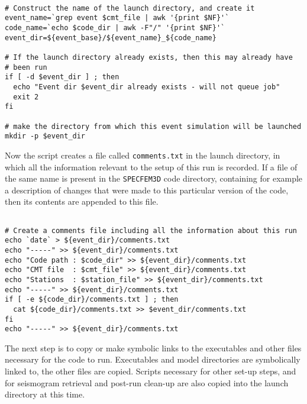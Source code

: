 \documentclass[onecolumn]{article}
\begin{document}
{\small
\begin{verbatim}

# Construct the name of the launch directory, and create it
event_name=`grep event $cmt_file | awk '{print $NF}'`
code_name=`echo $code_dir | awk -F"/" '{print $NF}'`
event_dir=${event_base}/${event_name}_${code_name}

# If the launch directory already exists, then this may already have
# been run
if [ -d $event_dir ] ; then
  echo "Event dir $event_dir already exists - will not queue job"
  exit 2
fi

# make the directory from which this event simulation will be launched
mkdir -p $event_dir

\end{verbatim}}

Now the script creates a file called \texttt{comments.txt} in the launch
directory, in which all the information relevant to the setup of this run
is recorded.
If a file of the same name is present in the \texttt{SPECFEM3D} code
directory, containing for example a description of changes that were
made to this particular version of the code, then its contents are appended
to this file.

{\small
\begin{verbatim}

# Create a comments file including all the information about this run
echo `date` > ${event_dir}/comments.txt
echo "-----" >> ${event_dir}/comments.txt
echo "Code path : $code_dir" >> ${event_dir}/comments.txt
echo "CMT file  : $cmt_file" >> ${event_dir}/comments.txt
echo "Stations  : $station_file" >> ${event_dir}/comments.txt
echo "-----" >> ${event_dir}/comments.txt
if [ -e ${code_dir}/comments.txt ] ; then
  cat ${code_dir}/comments.txt >> $event_dir/comments.txt
fi
echo "-----" >> ${event_dir}/comments.txt

\end{verbatim}}

The next step is to copy or make symbolic links to the executables and
other files necessary for the code to run.
Executables and model directories are symbolically linked to, the other
files are copied.
Scripts necessary for other set-up steps, and for seismogram retrieval and
post-run clean-up are also copied into the launch directory at this time.
\end{document}
